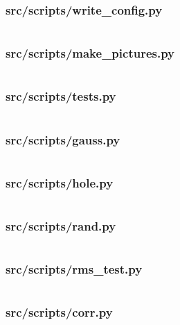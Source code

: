 \documentclass{article}
\begin{document}
\subsubsection{src/scripts/write\_config.py}
\inputminted[fontsize=\footnotesize]{Python}{../src/scripts/write_config.py}

\subsubsection{src/scripts/make\_pictures.py}
\inputminted[fontsize=\footnotesize]{Python}{../src/scripts/make_pictures.py}

\subsubsection{src/scripts/tests.py}
\inputminted[fontsize=\footnotesize]{Python}{../src/scripts/tests.py}

\subsubsection{src/scripts/gauss.py}
\inputminted[fontsize=\footnotesize]{Python}{../src/scripts/gauss.py}

\subsubsection{src/scripts/hole.py}
\inputminted[fontsize=\footnotesize]{Python}{../src/scripts/hole.py}

\subsubsection{src/scripts/rand.py}
\inputminted[fontsize=\footnotesize]{Python}{../src/scripts/rand.py}

\subsubsection{src/scripts/rms\_test.py}
\inputminted[fontsize=\footnotesize]{Python}{../src/scripts/rms_test.py}

\subsubsection{src/scripts/corr.py}
\inputminted[fontsize=\footnotesize]{Python}{../src/scripts/corr.py}

\restoregeometry{}
\end{document}
